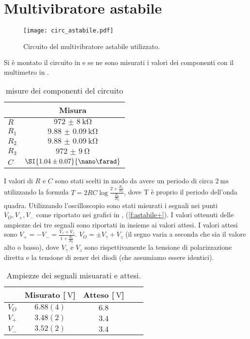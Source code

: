 \section{Multivibratore astabile}
\begin{figure}[h]
	\centering
	\texttt{[image: circ\_astabile.pdf]}
	\caption{Circuito del multivibratore astabile utilizzato.}
	\label{f:multi_vibr}
\end{figure}
Si è montato il circuito in  e se ne sono misurati i valori dei componenti con il multimetro in .
\begin{table}
	\centering
	\begin{tabular}{lc}
		& Misura \\
		\midrule
	$R$	&$\SI{972(8)}{\kohm}$\\
	 $R_1$	&$\SI{9.88(9)}{\kohm}$\\
	 $R_2$	&$\SI{9.88(9)}{\kohm}$\\
	 $R_3$	&$\SI{972(9)}{\ohm}$\\
	 $C$	&$\SI{1.04 \pm 0.07}{\nano\farad}$ \\
	\end{tabular}
	\caption{misure dei componenti del circuito}
	\label{t:misure_componenti}
\end{table}
I valori di $R$ e $C$ sono stati scelti in modo da avere un periodo di circa $\SI{2}{\ms}$ utilizzando la formula $T=2RC\log\frac{2+\frac{R_1}{R_2}}{\frac{R_1}{R_2}}$, dove T è proprio il periodo dell'onda quadra. Utilizzando l'oscilloscopio sono stati misurati i segnali nei punti $V_O , V_+ ,V_-$ come riportato nei grafici in , (\ref{f:astabile+}).
I valori ottenuti delle ampiezze dei tre segnali sono riportati in  insieme ai valori attesi.
I valori attesi sono $V_+=-V_-=\frac{V_\gamma +V_z}{1+\frac{R_1}{R_2}}$.  $V_O=\pm V_\gamma +V_z$ (il segno varia a seconda che sia il valore alto o basso), dove $V_\gamma$ e $V_z$ sono rispettivamente la tensione di polarizzazione diretta e la tensione di zener dei diodi (che assumiamo essere identici).
\begin{table}[h]
	\centering
	\begin{tabular}{lcccc}
	&Misurato [$\SI{}{\V}$]&Atteso [$\SI{}{\V}$] \\
	\midrule
	$V_O$	& $6.88(4)$	& $6.8$ \\
	$V_+$	& $3.48(2)$	& $3.4$ \\
	$V_-$	& $3.52(2)$	& $3.4$ \\
	\end{tabular}
	\caption{Ampiezze dei segnali misuarati e attesi.}
	\label{t:misure}
\end{table}


